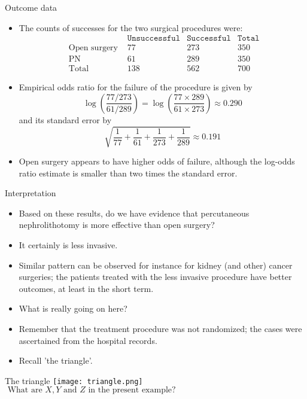 \documentclass[10pt,handout]{beamer}\usepackage[]{graphicx}\usepackage[]{color}
\begin{document}
\begin{frame}{Outcome data}
\begin{itemize}
	\item The counts of successes for the two surgical procedures were:
	$$
	\begin{array}{lccc}
	                       &\texttt{Unsuccessful}& \texttt{Successful}& \texttt{Total}\\
	\text { Open surgery } & 77 & 273 & 350 \\
	\text { PN } & 61 & 289 & 350 \\
	\text { Total } & 138 & 562 & 700
	\end{array}
	$$
	\item  Empirical odds ratio for the failure of the procedure is given by
	$$
	\log \left(\frac{77 / 273}{61 / 289}\right)=\log \left(\frac{77 \times 289}{61 \times 273}\right) \approx 0.290
	$$
	and its standard error by
	$$
	\sqrt{\frac{1}{77}+\frac{1}{61}+\frac{1}{273}+\frac{1}{289}} \approx 0.191
	$$
	\item Open surgery appears to have higher odds of failure, although the log-odds ratio estimate is smaller than two times the standard error.
\end{itemize}
\end{frame}


\begin{frame}{Interpretation}
\begin{itemize}
	\item Based on these results, do we have evidence that percutaneous nephrolithotomy is more effective than open surgery?
	\item It certainly is less invasive.
	\item Similar pattern can be observed for instance for kidney (and other) cancer surgeries; the patients treated with the less invasive procedure have better outcomes, at least in the short term.
	\item  What is really going on here?
	\item  Remember that the treatment procedure was not randomized; the cases were ascertained from the hospital records.
	\item  Recall 'the triangle'.
\end{itemize}
\end{frame}


\begin{frame}{The triangle}
\centering
\texttt{[image: triangle.png]}
\vspace{0.3in}
$\text { What are } X, Y \text { and } Z \text { in the present example? }$
\end{frame}
\end{document}
